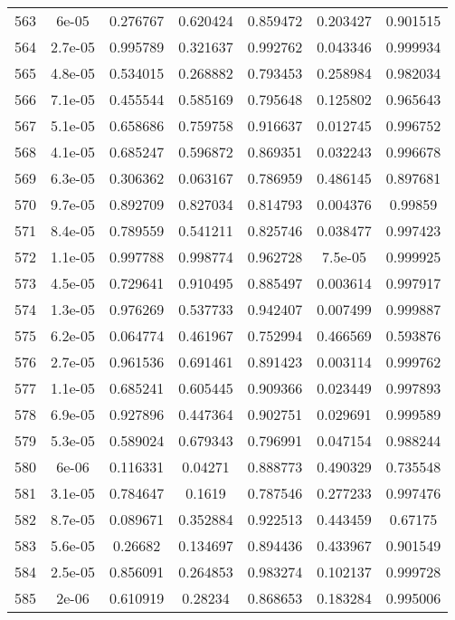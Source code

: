 \begin{table}
\begin{tabular}{c|c|c|c|c|c|c}
563 & 6e-05 & 0.276767 & 0.620424 & 0.859472 & 0.203427 & 0.901515\\
564 & 2.7e-05 & 0.995789 & 0.321637 & 0.992762 & 0.043346 & 0.999934\\
565 & 4.8e-05 & 0.534015 & 0.268882 & 0.793453 & 0.258984 & 0.982034\\
566 & 7.1e-05 & 0.455544 & 0.585169 & 0.795648 & 0.125802 & 0.965643\\
567 & 5.1e-05 & 0.658686 & 0.759758 & 0.916637 & 0.012745 & 0.996752\\
568 & 4.1e-05 & 0.685247 & 0.596872 & 0.869351 & 0.032243 & 0.996678\\
569 & 6.3e-05 & 0.306362 & 0.063167 & 0.786959 & 0.486145 & 0.897681\\
570 & 9.7e-05 & 0.892709 & 0.827034 & 0.814793 & 0.004376 & 0.99859\\
571 & 8.4e-05 & 0.789559 & 0.541211 & 0.825746 & 0.038477 & 0.997423\\
572 & 1.1e-05 & 0.997788 & 0.998774 & 0.962728 & 7.5e-05 & 0.999925\\
573 & 4.5e-05 & 0.729641 & 0.910495 & 0.885497 & 0.003614 & 0.997917\\
574 & 1.3e-05 & 0.976269 & 0.537733 & 0.942407 & 0.007499 & 0.999887\\
575 & 6.2e-05 & 0.064774 & 0.461967 & 0.752994 & 0.466569 & 0.593876\\
576 & 2.7e-05 & 0.961536 & 0.691461 & 0.891423 & 0.003114 & 0.999762\\
577 & 1.1e-05 & 0.685241 & 0.605445 & 0.909366 & 0.023449 & 0.997893\\
578 & 6.9e-05 & 0.927896 & 0.447364 & 0.902751 & 0.029691 & 0.999589\\
579 & 5.3e-05 & 0.589024 & 0.679343 & 0.796991 & 0.047154 & 0.988244\\
580 & 6e-06 & 0.116331 & 0.04271 & 0.888773 & 0.490329 & 0.735548\\
581 & 3.1e-05 & 0.784647 & 0.1619 & 0.787546 & 0.277233 & 0.997476\\
582 & 8.7e-05 & 0.089671 & 0.352884 & 0.922513 & 0.443459 & 0.67175\\
583 & 5.6e-05 & 0.26682 & 0.134697 & 0.894436 & 0.433967 & 0.901549\\
584 & 2.5e-05 & 0.856091 & 0.264853 & 0.983274 & 0.102137 & 0.999728\\
585 & 2e-06 & 0.610919 & 0.28234 & 0.868653 & 0.183284 & 0.995006\\
\end{tabular}
\end{table}

